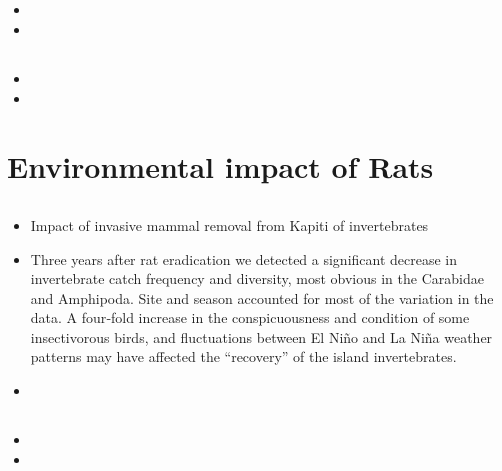 \documentclass[document.tex]{subfiles}
\begin{document}
    \subsection{\citetitle{}}
    \begin{itemize}
    \item 
    \item 
    \end{itemize}

    \subsection{\citetitle{}}
    \begin{itemize}
    \item 
    \item 
    \end{itemize}


\section{Environmental impact of Rats}

    \subsection{}
    \begin{itemize}
    \item Impact of invasive mammal removal from Kapiti of invertebrates
    \item Three years after rat eradication we detected a significant decrease in invertebrate catch frequency and diversity, most obvious in the Carabidae and Amphipoda. Site and season accounted for most of the variation in the data. A four‐fold increase in the conspicuousness and condition of some insectivorous birds, and fluctuations between El Niño and La Niña weather patterns may have affected the “recovery” of the island invertebrates. 
    \item 
    \end{itemize}


    \subsection{}
    \begin{itemize}
    \item 
    \item 
    \end{itemize}
\end{document}
